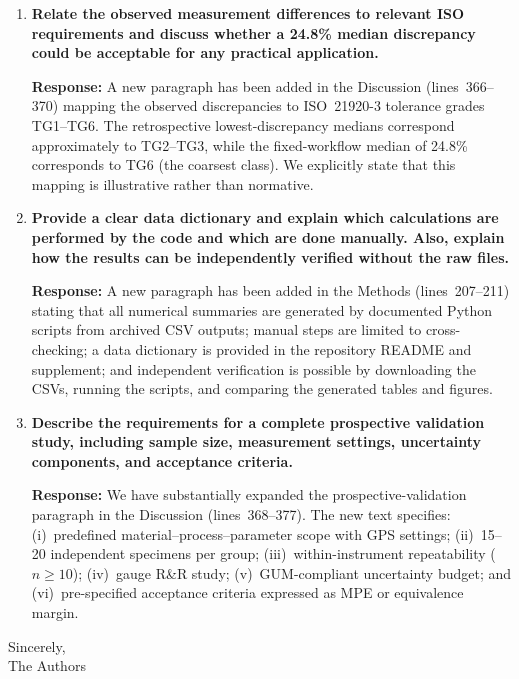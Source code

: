 \documentclass[10pt]{article}
\begin{document}
\begin{enumerate}[leftmargin=*, label=\textbf{Comment \arabic*.}, ref=\arabic*]
\item \textbf{Relate the observed measurement differences to relevant ISO requirements and discuss whether a 24.8\% median discrepancy could be acceptable for any practical application.}

\textbf{Response:} A new paragraph has been added in the Discussion (lines~366--370) mapping the observed discrepancies to ISO~21920-3 tolerance grades TG1--TG6. The retrospective lowest-discrepancy medians correspond approximately to TG2--TG3, while the fixed-workflow median of 24.8\% corresponds to TG6 (the coarsest class). We explicitly state that this mapping is illustrative rather than normative.

\item \textbf{Provide a clear data dictionary and explain which calculations are performed by the code and which are done manually. Also, explain how the results can be independently verified without the raw files.}

\textbf{Response:} A new paragraph has been added in the Methods (lines~207--211) stating that all numerical summaries are generated by documented Python scripts from archived CSV outputs; manual steps are limited to cross-checking; a data dictionary is provided in the repository README and supplement; and independent verification is possible by downloading the CSVs, running the scripts, and comparing the generated tables and figures.

\item \textbf{Describe the requirements for a complete prospective validation study, including sample size, measurement settings, uncertainty components, and acceptance criteria.}

\textbf{Response:} We have substantially expanded the prospective-validation paragraph in the Discussion (lines~368--377). The new text specifies: (i)~predefined material--process--parameter scope with GPS settings; (ii)~15--20 independent specimens per group; (iii)~within-instrument repeatability ($n \geq 10$); (iv)~gauge R\&R study; (v)~GUM-compliant uncertainty budget; and (vi)~pre-specified acceptance criteria expressed as MPE or equivalence margin.

\end{enumerate}

\vspace{4mm}
\noindent Sincerely,\\
The Authors
\end{document}
